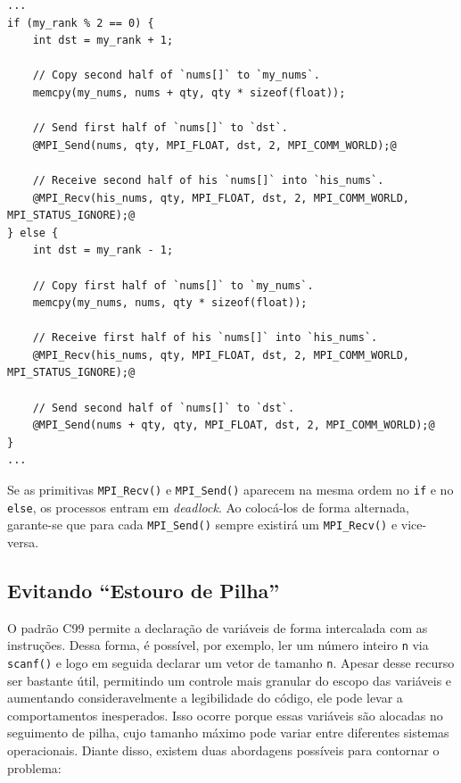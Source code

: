\documentclass[12pt,a4paper]{article}
\begin{document}
\begin{minipage}{\linewidth}
\begin{lstlisting}[frame=single, style=c, label={code:deadlock},
    caption={Ordem das primitivas MPI\_Send() e MPI\_Recv() na função \texttt{reduce\_sumtree()}.}]
...
if (my_rank % 2 == 0) {
    int dst = my_rank + 1;

    // Copy second half of `nums[]` to `my_nums`.
    memcpy(my_nums, nums + qty, qty * sizeof(float));

    // Send first half of `nums[]` to `dst`.
    @MPI_Send(nums, qty, MPI_FLOAT, dst, 2, MPI_COMM_WORLD);@

    // Receive second half of his `nums[]` into `his_nums`.
    @MPI_Recv(his_nums, qty, MPI_FLOAT, dst, 2, MPI_COMM_WORLD, MPI_STATUS_IGNORE);@
} else {
    int dst = my_rank - 1;

    // Copy first half of `nums[]` to `my_nums`.
    memcpy(my_nums, nums, qty * sizeof(float));

    // Receive first half of his `nums[]` into `his_nums`.
    @MPI_Recv(his_nums, qty, MPI_FLOAT, dst, 2, MPI_COMM_WORLD, MPI_STATUS_IGNORE);@

    // Send second half of `nums[]` to `dst`.
    @MPI_Send(nums + qty, qty, MPI_FLOAT, dst, 2, MPI_COMM_WORLD);@
}
...
\end{lstlisting}
\end{minipage}

Se as primitivas \texttt{MPI\_Recv()} e \texttt{MPI\_Send()} aparecem na mesma
ordem no \texttt{if} e no \texttt{else}, os processos entram em
\textit{deadlock}. Ao colocá-los de forma alternada, garante-se que para cada
\texttt{MPI\_Send()} sempre existirá um \texttt{MPI\_Recv()} e vice-versa.


\subsection{Evitando ``Estouro de Pilha''}
O padrão C99 permite a declaração de variáveis de forma intercalada com as
instruções. Dessa forma, é possível, por exemplo, ler um número inteiro
\texttt{n} via \texttt{scanf()} e logo em seguida declarar um vetor de tamanho
\texttt{n}. Apesar desse recurso ser bastante útil, permitindo um controle mais
granular do escopo das variáveis e aumentando consideravelmente a legibilidade
do código, ele pode levar a comportamentos inesperados. Isso ocorre porque essas
variáveis são alocadas no seguimento de pilha, cujo tamanho máximo pode variar
entre diferentes sistemas operacionais. Diante disso, existem duas abordagens
possíveis para contornar o problema:
\end{document}

